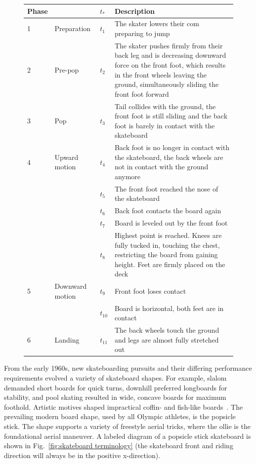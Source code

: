 \documentclass[default,iicol]{sn-jnl}
\begin{document}
\begin{figure}[!t]
{   \begin{center}
   \begin{tabular}{p{0.3 cm} p{1.6cm} p{0.3cm} p{12.4cm}}
       Phase & & $t_*$ & Description \\
       \toprule
       1 & Preparation     & $t_1$ & The skater lowers their \gls{com} preparing to jump \\
       2 & Pre-pop         & $t_2$ & The skater pushes firmly from their back leg and is decreasing downward force on the front foot, which results in the front wheels leaving the ground, simultaneously sliding the front foot forward \\
       3 & Pop             & $t_3$ & Tail collides with the ground, the front foot is still sliding and the back foot is barely in contact with the skateboard~\cite{determan_kinetics_2006,nakashima_simulation_2021} \\
       4 & Upward motion   & $t_4$ & Back foot is no longer in contact with the skateboard, the back wheels are not in contact with the ground anymore~\cite{determan_kinetics_2006,nakashima_simulation_2021} \\
                  &     & $t_5$ & The front foot reached the nose of the skateboard \\
                   &   & $t_6$ & Back foot contacts the board again \\
                    & & $t_7$ & Board is leveled out by the front foot \\
                    & & $t_8$ & Highest point is reached. Knees are fully tucked in, touching the chest, restricting the board from gaining height. Feet are firmly placed on the deck \\
     5 & Downward motion & $t_9$ & Front foot loses contact \\
         &            & $t_{10}$& Board is horizontal, both feet are in contact \\
     6 & Landing         & $t_{11}$& The back wheels touch the ground and legs are almost fully stretched out \\
 \end{tabular}
 \end{center}
}
  \label{fig:ollie steps}
\end{figure}

From the early 1960s, new skateboarding pursuits and their differing performance requirements evolved a variety of skateboard shapes.
For example, slalom demanded short boards for quick turns, downhill preferred longboards for stability, and pool skating resulted in wide, concave boards for maximum foothold. 
Artistic motives shaped impractical coffin- and
fish-like boards~\cite{prentiss_get_2011}.
The prevailing modern board shape, used by all Olympic athletes, is the popsicle stick.
The shape supports a variety of freestyle aerial tricks, where the ollie is the foundational aerial maneuver.
A labeled diagram of a popsicle stick skateboard is shown in Fig.~\ref{fig:skateboard terminology} (the skateboard front and riding direction will always be in the positive x-direction).
\end{document}
